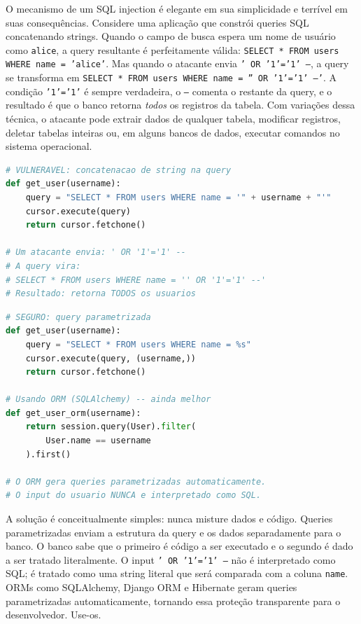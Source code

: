 O mecanismo de um SQL injection é elegante em sua simplicidade e terrível em
suas consequências. Considere uma aplicação que constrói queries SQL
concatenando strings. Quando o campo de busca espera um nome de usuário como
\texttt{alice}, a query resultante é perfeitamente válida: \texttt{SELECT *
FROM users WHERE name = 'alice'}. Mas quando o atacante envia
\texttt{' OR '1'='1' --}, a query se transforma em \texttt{SELECT * FROM users
WHERE name = '' OR '1'='1' --'}. A condição \texttt{'1'='1'} é sempre verdadeira,
o \texttt{--} comenta o restante da query, e o resultado é que o banco retorna
\emph{todos} os registros da tabela. Com variações dessa técnica, o atacante
pode extrair dados de qualquer tabela, modificar registros, deletar tabelas
inteiras ou, em alguns bancos de dados, executar comandos no sistema operacional.

\begin{lstlisting}[language=Python, caption={SQL Injection -- código vulnerável}]
# VULNERAVEL: concatenacao de string na query
def get_user(username):
    query = "SELECT * FROM users WHERE name = '" + username + "'"
    cursor.execute(query)
    return cursor.fetchone()

# Um atacante envia: ' OR '1'='1' --
# A query vira:
# SELECT * FROM users WHERE name = '' OR '1'='1' --'
# Resultado: retorna TODOS os usuarios
\end{lstlisting}

\begin{lstlisting}[language=Python, caption={SQL Injection -- código seguro}]
# SEGURO: query parametrizada
def get_user(username):
    query = "SELECT * FROM users WHERE name = %s"
    cursor.execute(query, (username,))
    return cursor.fetchone()

# Usando ORM (SQLAlchemy) -- ainda melhor
def get_user_orm(username):
    return session.query(User).filter(
        User.name == username
    ).first()

# O ORM gera queries parametrizadas automaticamente.
# O input do usuario NUNCA e interpretado como SQL.
\end{lstlisting}

A solução é conceitualmente simples: nunca misture dados e código. Queries
parametrizadas enviam a estrutura da query e os dados separadamente para o banco.
O banco sabe que o primeiro é código a ser executado e o segundo é dado a ser
tratado literalmente. O input \texttt{' OR '1'='1' --} não é interpretado como
SQL; é tratado como uma string literal que será comparada com a coluna
\texttt{name}. ORMs como SQLAlchemy, Django ORM e Hibernate geram queries
parametrizadas automaticamente, tornando essa proteção transparente para o
desenvolvedor. Use-os.

